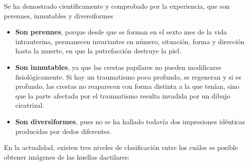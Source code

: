 Se ha demostrado científicamente y comprobado por la experiencia, que son perennes, inmutables y diversiformes 



\begin{itemize}
\item\textbf{Son perennes}, porque desde que se forman en el sexto mes de la vida intrauterina, permanecen invariantes en número, situación, forma y dirección hasta la muerte, en que la putrefacción destruye la piel.
\item\textbf{Son inmutables}, ya que las crestas papilares no pueden modificarse   fisiológicamente. Si hay un traumatismo poco profundo, se regeneran y si es profundo, las crestas no reaparecen con forma distinta a la que tenían, sino que la parte afectada por el traumatismo resulta invadida por un dibujo cicatrizal.
\item\textbf{Son diversiformes}, pues no se ha hallado todavía dos impresiones idénticas producidas por dedos diferentes.
\end{itemize}



En la  actualidad, existen tres niveles de clasificación entre los cuáles es posible obtener imágenes de las huellas dactilares:

